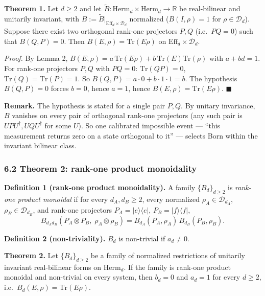 \documentclass[
]{article}
\begin{document}
\textbf{Theorem 1.} Let \(d\geq 2\) and let
\(\widetilde B:\mathrm{Herm}_d\times\mathrm{Herm}_d\to\mathbb R\) be
real-bilinear and unitarily invariant, with
\(B:=\widetilde B|_{\mathrm{Eff}_d\times\mathcal D_d}\) normalized
(\(B(I,\rho)=1\) for \(\rho\in\mathcal D_d\)). Suppose there exist two
orthogonal rank-one projectors \(P,Q\) (i.e.~\(PQ=0\)) such that
\(B(Q,P)=0\). Then \(B(E,\rho)=\mathrm{Tr}(E\rho)\) on
\(\mathrm{Eff}_d\times\mathcal D_d\).

\emph{Proof.} By Lemma 2,
\(B(E,\rho)=a\,\mathrm{Tr}(E\rho)+b\,\mathrm{Tr}(E)\mathrm{Tr}(\rho)\)
with \(a+bd=1\). For rank-one projectors \(P,Q\) with \(PQ=0\):
\(\mathrm{Tr}(QP)=0\), \(\mathrm{Tr}(Q)=\mathrm{Tr}(P)=1\). So
\(B(Q,P)=a\cdot 0+b\cdot 1\cdot 1=b\). The hypothesis \(B(Q,P)=0\)
forces \(b=0\), hence \(a=1\), hence \(B(E,\rho)=\mathrm{Tr}(E\rho)\).
\(\blacksquare\)

\textbf{Remark.} The hypothesis is stated for a single pair \(P,Q\). By
unitary invariance, \(B\) vanishes on every pair of orthogonal rank-one
projectors (any such pair is \(UPU^\dagger,UQU^\dagger\) for some
\(U\)). So one calibrated impossible event --- ``this measurement
returns zero on a state orthogonal to it'' --- selects Born within the
invariant bilinear class.

\subsubsection{6.2 Theorem 2: rank-one product
monoidality}\label{theorem-2-rank-one-product-monoidality}

\textbf{Definition 1 (rank-one product monoidality).} A family
\(\{B_d\}_{d\geq 2}\) is \emph{rank-one product monoidal} if for every
\(d_A,d_B\geq 2\), every normalized \(\rho_A\in\mathcal D_{d_A}\),
\(\rho_B\in\mathcal D_{d_B}\), and rank-one projectors
\(P_A=|e\rangle\langle e|\), \(P_B=|f\rangle\langle f|\),
\[B_{d_Ad_B}(P_A\otimes P_B,\;\rho_A\otimes\rho_B) = B_{d_A}(P_A,\rho_A)\,B_{d_B}(P_B,\rho_B).\]

\textbf{Definition 2 (non-triviality).} \(B_d\) is non-trivial if
\(a_d\neq 0\).

\textbf{Theorem 2.} Let \(\{B_d\}_{d\geq 2}\) be a family of normalized
restrictions of unitarily invariant real-bilinear forms on
\(\mathrm{Herm}_d\). If the family is rank-one product monoidal and
non-trivial on every system, then \(b_d=0\) and \(a_d=1\) for every
\(d\geq 2\), i.e.~\(B_d(E,\rho)=\mathrm{Tr}(E\rho)\).
\end{document}
